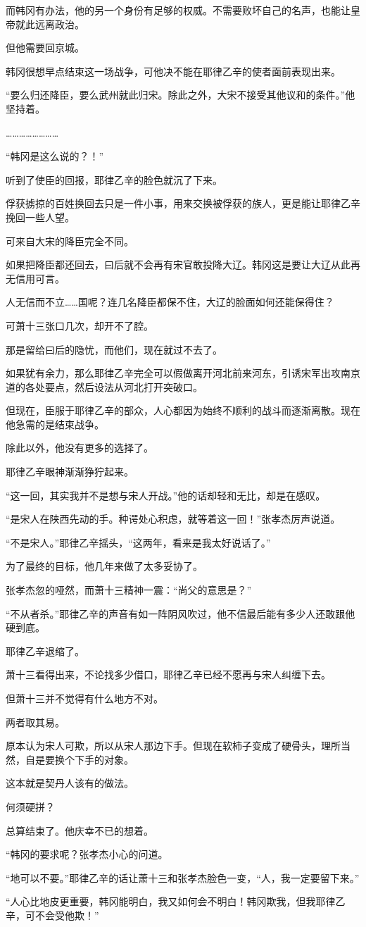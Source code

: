 而韩冈有办法，他的另一个身份有足够的权威。不需要败坏自己的名声，也能让皇帝就此远离政治。

但他需要回京城。

韩冈很想早点结束这一场战争，可他决不能在耶律乙辛的使者面前表现出来。

“要么归还降臣，要么武州就此归宋。除此之外，大宋不接受其他议和的条件。”他坚持着。

……………………

“韩冈是这么说的？！”

听到了使臣的回报，耶律乙辛的脸色就沉了下来。

俘获掳掠的百姓换回去只是一件小事，用来交换被俘获的族人，更是能让耶律乙辛挽回一些人望。

可来自大宋的降臣完全不同。

如果把降臣都还回去，曰后就不会再有宋官敢投降大辽。韩冈这是要让大辽从此再无信用可言。

人无信而不立……国呢？连几名降臣都保不住，大辽的脸面如何还能保得住？

可萧十三张口几次，却开不了腔。

那是留给曰后的隐忧，而他们，现在就过不去了。

如果犹有余力，那么耶律乙辛完全可以假做离开河北前来河东，引诱宋军出攻南京道的各处要点，然后设法从河北打开突破口。

但现在，臣服于耶律乙辛的部众，人心都因为始终不顺利的战斗而逐渐离散。现在他急需的是结束战争。

除此以外，他没有更多的选择了。

耶律乙辛眼神渐渐狰狞起来。

“这一回，其实我并不是想与宋人开战。”他的话却轻和无比，却是在感叹。

“是宋人在陕西先动的手。种谔处心积虑，就等着这一回！”张孝杰厉声说道。

“不是宋人。”耶律乙辛摇头，“这两年，看来是我太好说话了。”

为了最终的目标，他几年来做了太多妥协了。

张孝杰忽的哑然，而萧十三精神一震：“尚父的意思是？”

“不从者杀。”耶律乙辛的声音有如一阵阴风吹过，他不信最后能有多少人还敢跟他硬到底。

耶律乙辛退缩了。

萧十三看得出来，不论找多少借口，耶律乙辛已经不愿再与宋人纠缠下去。

但萧十三并不觉得有什么地方不对。

两者取其易。

原本认为宋人可欺，所以从宋人那边下手。但现在软柿子变成了硬骨头，理所当然，自是要换个下手的对象。

这本就是契丹人该有的做法。

何须硬拼？

总算结束了。他庆幸不已的想着。

“韩冈的要求呢？张孝杰小心的问道。

“地可以不要。”耶律乙辛的话让萧十三和张孝杰脸色一变，“人，我一定要留下来。”

“人心比地皮更重要，韩冈能明白，我又如何会不明白！韩冈欺我，但我耶律乙辛，可不会受他欺！”
